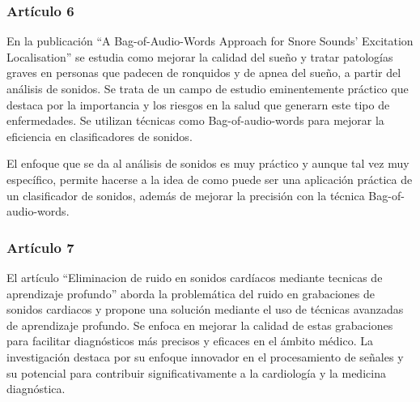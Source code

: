 \subsubsection*{Artículo 6}
    En la publicación “A Bag-of-Audio-Words Approach for Snore Sounds' Excitation Localisation”\cite{schmitt2016bag} se estudia como mejorar la calidad del sueño y tratar patologías graves en personas que padecen de ronquidos y de apnea del sueño, a partir del análisis de sonidos. Se trata de un campo de estudio eminentemente práctico que destaca por la importancia y los riesgos en la salud que generarn este tipo de enfermedades. Se utilizan técnicas como Bag-of-audio-words para mejorar la eficiencia en clasificadores de sonidos.

    El enfoque que se da al análisis de sonidos es muy práctico y aunque tal vez muy específico, permite hacerse a la idea de como puede ser una aplicación práctica de un clasificador de sonidos, además de mejorar la precisión con la técnica Bag-of-audio-words.
\subsubsection*{Artículo 7}
     El artículo ``Eliminacion de ruido en sonidos cardíacos mediante tecnicas de aprendizaje profundo''\cite{rodriguezeliminacion} aborda la problemática del ruido en grabaciones de sonidos cardiacos y propone una solución mediante el uso de técnicas avanzadas de aprendizaje profundo. Se enfoca en mejorar la calidad de estas grabaciones para facilitar diagnósticos más precisos y eficaces en el ámbito médico. La investigación destaca por su enfoque innovador en el procesamiento de señales y su potencial para contribuir significativamente a la cardiología y la medicina diagnóstica.

